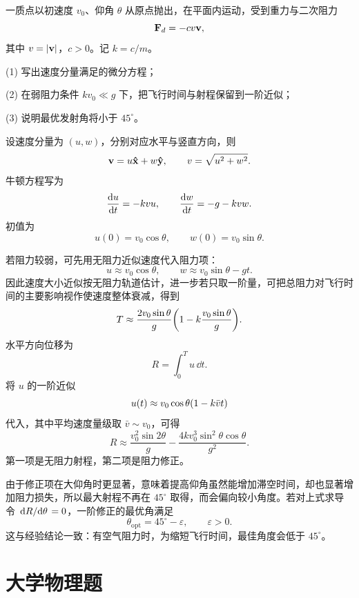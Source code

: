 \begin{competition}
一质点以初速度 $v_0$、仰角 $\theta$ 从原点抛出，在平面内运动，受到重力与二次阻力
\[
\vb F_d=-c v\vb v,
\]
其中 $v=\abs{\vb v}$，$c>0$。记 $k=c/m$。

(1) 写出速度分量满足的微分方程；

(2) 在弱阻力条件 $k v_0\ll g$ 下，把飞行时间与射程保留到一阶近似；

(3) 说明最优发射角将小于 $45^\circ$。

\begin{solution}
设速度分量为 $(u,w)$，分别对应水平与竖直方向，则
\[
\vb v=u\vu x+w\vu y,
\qquad v=\sqrt{u^2+w^2}.
\]
牛顿方程写为
\[
\dv{u}{t}=-kvu,
\qquad
\dv{w}{t}=-g-kvw.
\]
初值为
\[
u(0)=v_0\cos\theta,
\qquad
w(0)=v_0\sin\theta.
\]

若阻力较弱，可先用无阻力近似速度代入阻力项：
\[
u\approx v_0\cos\theta,
\qquad
w\approx v_0\sin\theta-gt.
\]
因此速度大小近似按无阻力轨道估计，进一步若只取一阶量，可把总阻力对飞行时间的主要影响视作使速度整体衰减，得到
\[
T\approx \frac{2v_0\sin\theta}{g}\qty(1-k\frac{v_0\sin\theta}{g}).
\]
水平方向位移为
\[
R=\int_0^T u\,\dd t.
\]
将 $u$ 的一阶近似
\[
u(t)\approx v_0\cos\theta\qty(1-k\bar v t)
\]
代入，其中平均速度量级取 $\bar v\sim v_0$，可得
\[
R\approx \frac{v_0^2\sin2\theta}{g}-\frac{4k v_0^3\sin^2\theta\cos\theta}{g^2}.
\]
第一项是无阻力射程，第二项是阻力修正。

由于修正项在大仰角时更显著，意味着提高仰角虽然能增加滞空时间，却也显著增加阻力损失，所以最大射程不再在 $45^\circ$ 取得，而会偏向较小角度。若对上式求导令 $\dv*{R}{\theta}=0$，一阶修正的最优角满足
\[
\theta_\text{opt}=45^\circ-\varepsilon,
\qquad \varepsilon>0.
\]
这与经验结论一致：有空气阻力时，为缩短飞行时间，最佳角度会低于 $45^\circ$。
\end{solution}
\end{competition}

\section*{大学物理题}

